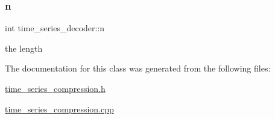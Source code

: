 \subsubsection{\texorpdfstring{n}{n}}
{\footnotesize\ttfamily int time\+\_\+series\+\_\+decoder\+::n\hspace{0.3cm}{\ttfamily [private]}}



the length 



The documentation for this class was generated from the following files\+:\begin{DoxyCompactItemize}
\item 
\hyperlink{time__series__compression_8h}{time\+\_\+series\+\_\+compression.\+h}\item 
\hyperlink{time__series__compression_8cpp}{time\+\_\+series\+\_\+compression.\+cpp}\end{DoxyCompactItemize}
